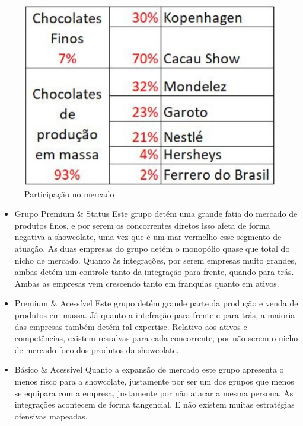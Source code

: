 \documentclass[
	12pt,				%
	openright,			%
	oneside,			%
	a4paper,			%
	english,			%
	french,				%
	spanish,			%
	brazil				%
	]{abntex2}
\begin{document}
\begin{figure}[H]
\begin{center}
\caption{Participação no mercado}
\includegraphics[scale=0.4]{concorrentes.jpeg} 
\end{center}
\end{figure}

\begin{itemize}
\item Grupo Premium $\&$ Status
\subitem Este grupo detém uma grande fatia do mercado de produtos finos, e por serem os concorrentes diretos isso afeta de forma negativa a showcolate, uma vez que é um mar vermelho esse segmento de atuação. As duas empresas do grupo detém o monopólio quase que total do nicho de mercado.
\subitem Quanto às integrações, por serem empresas muito grandes, ambas detém um controle tanto da integração para frente, quando para trás.
\subitem Ambas as empresas vem crescendo tanto em franquias quanto em ativos.
\item Premium $\&$ Acessível
\subitem Este grupo detém grande parte da produção e venda de produtos em massa.
\subitem Já quanto a intefração para frente e para trás, a maioria das empresas também detém tal expertise.
\subitem Relativo aos ativos e competências, existem ressalvas para cada concorrente, por não serem o nicho de mercado foco dos produtos da showcolate.
\item Básico $\&$ Acessível
\subitem Quanto a expansão de mercado este grupo apresenta o menos risco para a showcolate, justamente por ser um dos grupos que menos se equipara com a empresa, justamente por não atacar a mesma persona.
\subitem As integrações acontecem de forma tangencial.
\subitem E não existem muitas estratégias ofensivas mapeadas.
\end{itemize}
\end{document}
